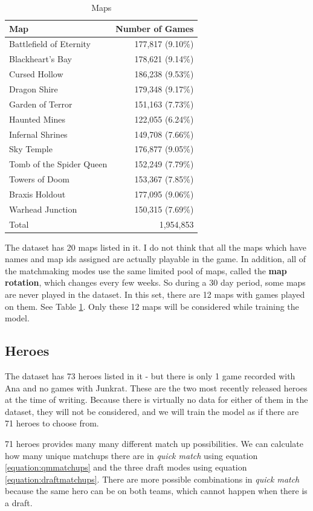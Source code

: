 \documentclass[twoside,twocolumn]{article}
\begin{document}
\begin{table}[h]
\caption{Maps}
\label{table:maps}
\centering
\begin{tabular}{lr}
\toprule
Map & Number of Games \\
\midrule
Battlefield of Eternity & 177,817  (9.10\%) \\
Blackheart's Bay & 178,621  (9.14\%) \\
Cursed Hollow & 186,238  (9.53\%) \\
Dragon Shire & 179,348  (9.17\%) \\
Garden of Terror & 151,163  (7.73\%) \\
Haunted Mines & 122,055  (6.24\%) \\
Infernal Shrines & 149,708  (7.66\%) \\
Sky Temple & 176,877  (9.05\%) \\
Tomb of the Spider Queen & 152,249  (7.79\%) \\
Towers of Doom & 153,367  (7.85\%) \\
Braxis Holdout & 177,095  (9.06\%) \\
Warhead Junction & 150,315  (7.69\%) \\
\midrule
Total & 1,954,853 \\
\bottomrule
\end{tabular}
\end{table}

The dataset has 20 maps listed in it.  I do not think that all the maps which have names and map ids assigned are actually playable in the game.  In addition, all of the matchmaking modes use the same limited pool of maps, called the \textbf{map rotation}, which changes every few weeks.  So during a 30 day period, some maps are never played in the dataset.  In this set, there are 12 maps with games played on them. See Table \ref{table:maps}.  Only these 12 maps will be considered while training the model.

\subsection{Heroes}

The dataset has 73 heroes listed in it - but there is only 1 game recorded with Ana and no games with Junkrat.  These are the two most recently released heroes at the time of writing.  Because there is virtually no data for either of them in the dataset, they will not be considered, and we will train the model as if there are 71 heroes to choose from.

71 heroes provides many many different match up possibilities.  We can calculate how many unique matchups there are in \textit{quick match} using equation \ref{equation:qmmatchups} and the three draft modes using equation \ref{equation:draftmatchups}.  There are more possible combinations in \textit{quick match} because the same hero can be on both teams, which cannot happen when there is a draft. 
\end{document}
